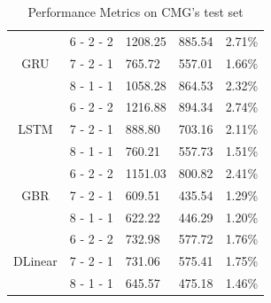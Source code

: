 \documentclass{ieeeojies}
\begin{document}
\begin{table}[H]
\begin{tabular}{|c|c|p{1cm}|p{1cm}|p{1cm}|}
        \hline
        \multirow{3}{*}{GRU}
                       & 6 - 2 - 2               & 1208.25       & 885.54       & 2.71\%        \\
        \cline{2-5}
                       & 7 - 2 - 1               & 765.72        & 557.01       & 1.66\%        \\
        \cline{2-5}
                       & 8 - 1 - 1               & 1058.28       & 864.53       & 2.32\%        \\
        \hline
        \multirow{3}{*}{LSTM}
                       & 6 - 2 - 2               & 1216.88       & 894.34       & 2.74\%        \\
        \cline{2-5}
                       & 7 - 2 - 1               & 888.80        & 703.16       & 2.11\%        \\
        \cline{2-5}
                       & 8 - 1 - 1               & 760.21        & 557.73       & 1.51\%        \\
        \hline
        \multirow{3}{*}{GBR}
                       & 6 - 2 - 2               & 1151.03       & 800.82       & 2.41\%        \\
        \cline{2-5}
                       & 7 - 2 - 1               & 609.51        & 435.54       & 1.29\%        \\
        \cline{2-5}
                       & 8 - 1 - 1               & 622.22        & 446.29       & 1.20\%        \\
        \hline
        \multirow{3}{*}{DLinear}
                       & 6 - 2 - 2               & 732.98        & 577.72       & 1.76\%        \\
        \cline{2-5}
                       & 7 - 2 - 1               & 731.06        & 575.41       & 1.75\%        \\
        \cline{2-5}
                       & 8 - 1 - 1               & 645.57        & 475.18       & 1.46\%        \\
        \hline
    \end{tabular}
    \caption{Performance Metrics on CMG's test set}
    \label{tab:performance_metrics_cmg}
\end{table}
\end{document}
